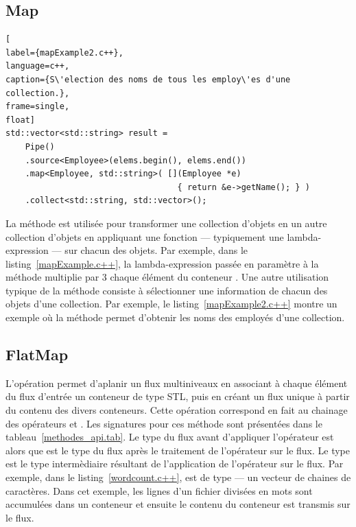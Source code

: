 \subsection{Map}



\begin{lstlisting}[
label={mapExample2.c++},
language=c++,
caption={S\'election des noms de tous les employ\'es d'une collection.},
frame=single,
float]
std::vector<std::string> result =
    Pipe()
    .source<Employee>(elems.begin(), elems.end())
    .map<Employee, std::string>( [](Employee *e) 
                                   { return &e->getName(); } )
    .collect<std::string, std::vector>();
\end{lstlisting}




La m\'ethode  est utilis\'ee pour transformer une collection d'objets en un autre collection d'objets en appliquant une fonction --- typiquement une lambda-expression --- sur chacun des objets. Par exemple, dans le listing~\ref{mapExample.c++}, la lambda-expression pass\'ee en param\`etre \`a la m\'ethode  multiplie par 3 chaque \'el\'ement du conteneur . Une autre utilisation typique de la méthode  consiste \`a s\'electionner une information de chacun des objets d'une collection. Par exemple, le listing~\ref{mapExample2.c++} montre un exemple o\`u la méthode  permet d'obtenir les noms des employ\'es d'une collection. 


\subsection{FlatMap}

L'op\'eration   permet d'aplanir un flux multiniveaux en associant \`a chaque \'el\'ement du flux d'entr\'ee un conteneur de type STL, puis en cr\'eant un flux unique \`a partir du contenu des divers conteneurs. Cette op\'eration correspond en fait au chainage des op\'erateurs  et . Les  signatures pour ces m\'ethode sont pr\'esent\'ees dans le tableau~\ref{methodes_api.tab}. Le type du flux avant d'appliquer l'op\'erateur  est  alors que  est le type du flux apr\`es le traitement de l'op\'erateur sur le flux. Le type  est le type interm\`ediaire r\'esultant de l'application de l'op\'erateur  sur le flux. Par exemple, dans le listing~\ref{wordcount.c++},  est de type  --- un vecteur de chaines de caract\`eres. Dans cet exemple, les lignes d'un fichier divis\'ees en mots sont accumul\'ees dans un conteneur et ensuite le contenu du conteneur est transmis sur le flux.


